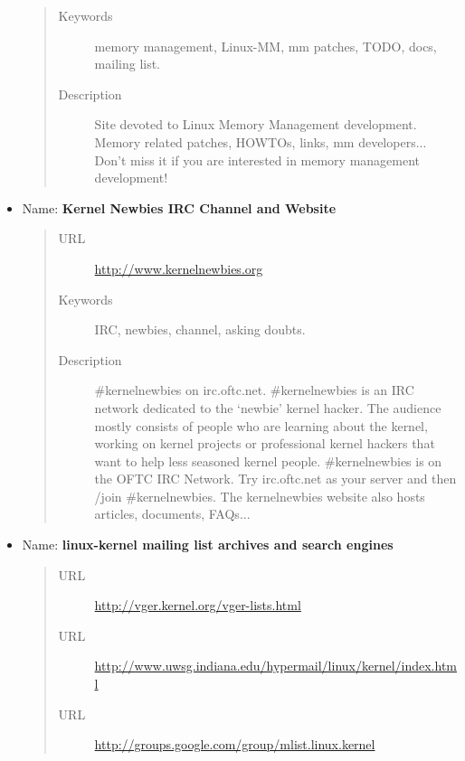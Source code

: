 \documentclass[a4paper,8pt,english]{sphinxmanual}
\begin{document}
\begin{itemize}
\begin{quote}
\begin{description}
\item[{Keywords}] \leavevmode
memory management, Linux-MM, mm patches, TODO, docs,
mailing list.

\item[{Description}] \leavevmode
Site devoted to Linux Memory Management development.
Memory related patches, HOWTOs, links, mm developers... Don't miss
it if you are interested in memory management development!

\end{description}\end{quote}

\item {} 
Name: \textbf{Kernel Newbies IRC Channel and Website}
\begin{quote}\begin{description}
\item[{URL}] \leavevmode
\href{http://www.kernelnewbies.org}{http://www.kernelnewbies.org}

\item[{Keywords}] \leavevmode
IRC, newbies, channel, asking doubts.

\item[{Description}] \leavevmode
\#kernelnewbies on irc.oftc.net.
\#kernelnewbies is an IRC network dedicated to the `newbie'
kernel hacker. The audience mostly consists of people who are
learning about the kernel, working on kernel projects or
professional kernel hackers that want to help less seasoned kernel
people.
\#kernelnewbies is on the OFTC IRC Network.
Try irc.oftc.net as your server and then /join \#kernelnewbies.
The kernelnewbies website also hosts articles, documents, FAQs...

\end{description}\end{quote}

\item {} 
Name: \textbf{linux-kernel mailing list archives and search engines}
\begin{quote}\begin{description}
\item[{URL}] \leavevmode
\href{http://vger.kernel.org/vger-lists.html}{http://vger.kernel.org/vger-lists.html}

\item[{URL}] \leavevmode
\href{http://www.uwsg.indiana.edu/hypermail/linux/kernel/index.html}{http://www.uwsg.indiana.edu/hypermail/linux/kernel/index.html}

\item[{URL}] \leavevmode
\href{http://groups.google.com/group/mlist.linux.kernel}{http://groups.google.com/group/mlist.linux.kernel}


\end{description}
\end{quote}
\end{itemize}
\end{document}
